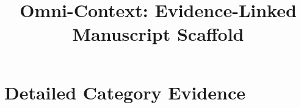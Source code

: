 \documentclass[10pt,twocolumn]{article}
\title{Omni-Context: Evidence-Linked Manuscript Scaffold}
\author{\TODO{Author names and affiliations required.}}
\date{}
\begin{document}
\maketitle












\clearpage
\onecolumn
\appendix
\section{Detailed Category Evidence}





\end{document}
